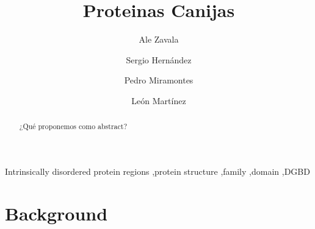 \documentclass[preprint,12pt]{elsarticle}
\begin{document}
\begin{frontmatter}


\title{Proteinas Canijas}




\author[1]{Ale Zavala}
\author[1]{Sergio Hern\'andez }
\author[1]{Pedro Miramontes}
\author[2]{León Martínez}

\address[1]{Facultad de Ciencias, National Autonomous University of Mexico, Mexico City 04510, Mexico}
\address[2]{Metropolitan Autonomous University}

\begin{abstract}
¿Qué proponemos como abstract?
\end{abstract}

\begin{keyword}
Intrinsically disordered protein regions \sep protein structure \sep family \sep domain \sep DGBD


\end{keyword}

\end{frontmatter}

\linenumbers

\section{Background}
\label{S:1}
\end{document}
